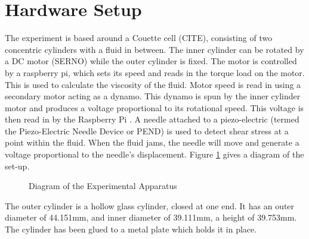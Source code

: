 \documentclass[twoside,a4]{report}
\def\br{\newline \newline \noindent}
\def\rpi{Raspberry Pi }
\begin{document}
	\section{Hardware Setup} %
	The experiment is based around a Couette cell (CITE), consisting of two concentric cylinders with a fluid in between. The inner cylinder can be rotated by a DC motor (SERNO) while the outer cylinder is fixed. The motor is controlled by a raspberry pi, which sets its speed and reads in the torque load on the motor. This is used to calculate the viscosity of the fluid. 
	Motor speed is read in using a secondary motor acting as a dynamo. This dynamo is spun by the inner cylinder motor and produces a voltage proportional to its rotational speed. This voltage is then read in by the \rpi.
	A needle attached to a piezo-electric (termed the Piezo-Electric Needle Device or PEND) is used to detect shear stress at a point within the fluid. When the fluid jams, the needle will move and generate a voltage proportional to the needle's displacement. Figure \ref{expdia} gives a diagram of the set-up.\newline
	\begin{figure}[!htb]
	\centering
	\caption{Diagram of the Experimental Apparatus}
	\label{expdia}
	\end{figure} \newline \noindent
	The outer cylinder is a hollow glass cylinder, closed at one end. It has an outer diameter of 44.151mm, and inner diameter of 39.111mm, a height of 39.753mm. The cylinder has been glued to a metal plate which holds it in place. \br
\end{document}
